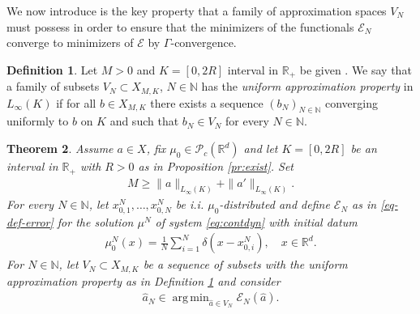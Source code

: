 \documentclass[A4paper,11pt]{article}
\newtheorem{theorem}{Theorem}[section]
\theoremstyle{definition}
\newtheorem{definition}[theorem]{Definition}
\newcommand{\N}{\mathbb{N}}
\newcommand{\R}{\mathbb{R}}
\DeclareMathOperator{\supp}{supp}
\DeclareMathOperator{\argmin}{arg\,min}
\begin{document}
We now introduce is the key property that a family of approximation spaces $V_N$ must possess in order to ensure that the minimizers of the functionals $\mathcal E_N$ converge to minimizers of $\mathcal E$ by $\Gamma$-convergence.

\begin{definition}\label{VNdef}
Let $M > 0$ and $K=[0,2R]$ interval in $\R_+$  be given . We say that a family of subsets $V_N \subset X_{M,K}$, $N \in \N$ has the \emph{uniform approximation property} in $L_{\infty}(K)$ if for all $b\in X_{M,K}$ there exists a sequence $(b_N)_{N \in \N}$ converging uniformly to $b$ on $K$ and such that $b_N\in V_N$ for every $N \in \N$.
\end{definition}


\begin{theorem}\label{thm} Assume $a\in X$, fix $\mu_0 \in \mathcal{P}_c(\R^d)$ and let  $K=[0,2R]$ be an interval in $\R_+$ with $R>0$ as in Proposition \ref{pr:exist}.
	Set
	\begin{align*}
	M \geq \|a\|_{L_{\infty}(K)} + \|a'\|_{L_{\infty}(K)}.
	\end{align*}
	For every $N \in \N$, let $x^N_{0,1},\ldots,x^N_{0,N}$ be i.i. $\mu_0$-distributed and define $\mathcal E_N$ as in \eqref{eq-def-error} for the solution $\mu^N$ of system \eqref{eq:contdyn} with initial datum
	\begin{align*}
	\mu^{N}_0(x) = \frac{1}{N}\sum^N_{i = 1} \delta(x - x^{N}_{0,i}), \quad x \in \R^d.
	\end{align*}
	For  $N \in \N$, let $V_N\subset X_{M,K}$ be a sequence of subsets with the uniform approximation property as in Definition \ref{VNdef} and consider
	\begin{align*}
		\widehat a_N\in\argmin_{\widehat a\in V_N} \mathcal E_N(\widehat a).
	\end{align*}
	

\end{theorem}
\end{document}
